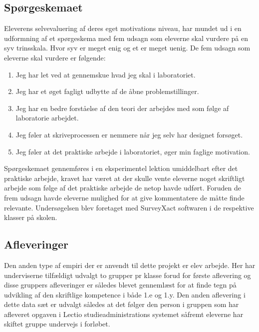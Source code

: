 \subsection*{Spørgeskemaet}
Eleverens selvevaluering af deres eget motivations niveau, har mundet ud i en udformning af et spørgeskema med fem udsagn som eleverne skal vurdere på en syv trinsskala. Hvor syv er meget enig og et er meget uenig. De fem udsagn som eleverne skal vurdere er følgende:
\begin{enumerate}
	\item Jeg har let ved at gennemskue hvad jeg skal i laboratoriet.\vspace{-15pt}
 	\item Jeg har et øget fagligt udbytte af de åbne problemstillinger.\vspace{-15pt}
	\item Jeg har en bedre forståelse af den teori der arbejdes med som følge af laboratorie arbejdet.\vspace{-15pt}
	\item Jeg føler at skriveprocessen er nemmere når jeg selv har designet forsøget.\vspace{-15pt}
	\item Jeg føler at det praktiske arbejde i laboratoriet, øger min faglige motivation.
\end{enumerate}
Spørgeskemaet gennemføres i en eksperimentel lektion umiddelbart efter det praktiske arbejde, kravet har været at der skulle vente eleverne noget skriftligt arbejde som følge af det praktiske arbejde de netop havde udført. Foruden de frem udsagn havde eleverne mulighed for at give kommentatere de måtte finde relevante. Undersøgelsen blev foretaget med SurveyXact softwaren i de respektive klasser på skolen.

\subsection*{Afleveringer}
Den anden type af empiri der er anvendt til dette projekt er elev arbejde. Her har underviserne tilfældigt udvalgt to grupper pr klasse forud for første aflevering og disse gruppers afleveringer er således blevet gennemlæst for at finde tegn på udvikling af den skriftlige kompetence i både 1.e og 1.y. Den anden aflevering i dette data sæt er udvalgt således at det følger den person i gruppen som har afleveret opgaven i Lectio studieadministrations systemet såfremt eleverne har skiftet gruppe undervejs i forløbet. 

